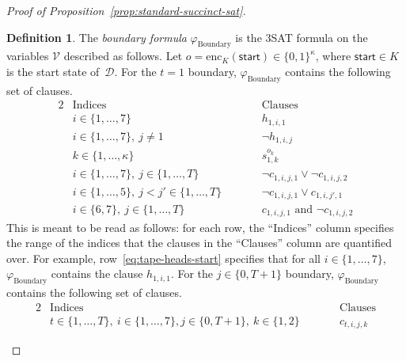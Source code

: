\documentclass[11pt]{article}
\theoremstyle{definition}
\newtheorem{definition}[theorem]{Definition}
\newcommand{\decider}{\mathcal{D}}
\begin{document}
\begin{proof}[Proof of Proposition~\ref{prop:standard-succinct-sat}]
  \begin{definition}
    The \emph{boundary formula} $\varphi_{\mathrm{Boundary}}$ is the 3SAT
    formula on the variables $\mathcal{V}$ described as follows.
    Let $o = \mathrm{enc}_K({\mathsf{start}}) \in \{0, 1\}^\kappa$, where
    ${\mathsf{start}} \in K$ is the start state of~$\decider$.
    For the $t= 1$ boundary, $\varphi_{\mathrm{Boundary}}$ contains the
    following set of clauses.
    \begin{alignat}{2}
      & \text{Indices} & \qquad & \text{Clauses}\nonumber\\
      & i \in \{1, \ldots, 7\} && h_{1, i, 1}
      \label{eq:tape-heads-start}\\
      & i \in \{1, \ldots, 7\},~ j \neq 1 && \neg h_{1, i, j}
      \label{eq:no-more-tape-heads}\\
      & k \in \{1, \ldots, \kappa\} && s_{1, k}^{o_k}
      \label{eq:start-state}\\
      & i \in \{1, \ldots, 7\},~ j \in \{1, \ldots, T\} &&
      \neg c_{1, i, j, 1} \lor \neg c_{1, i, j, 2}
      \label{eq:not-square}\\
      & i \in \{1, \ldots, 5\},~ j < j' \in \{1, \ldots, T\} &&
      \neg c_{1, i, j, 1} \lor c_{1, i, j', 1}
      \label{eq:trailing-empty}\\
      & i \in \{6, 7\},~ j \in \{1, \ldots, T\}
      && c_{1, i, j, 1} \text{ and } \neg c_{1, i, j, 2}
      \label{eq:all-empty}
    \end{alignat}
    This is meant to be read as follows: for each row, the ``Indices'' column
    specifies the range of the indices that the clauses in the ``Clauses'' column
    are quantified over.
    For example, row~\eqref{eq:tape-heads-start} specifies that for all $i \in
    \{1, \ldots, 7\}$, $\varphi_{\mathrm{Boundary}}$ contains the clause $h_{1,
      i, 1}$.
    For the $j \in \{0, T+1\}$ boundary, $\varphi_{\mathrm{Boundary}}$ contains
    the following set of clauses.
    \begin{alignat}{2}
      & \text{Indices} & \qquad & \text{Clauses}\nonumber\\
      & t \in \{1, \ldots, T\},~i \in \{1, \ldots, 7\},
      j \in \{0, T+1\},~k \in \{1, 2\}
      && c_{t, i, j, k} \label{eq:square}
    \end{alignat}
  \end{definition}


\end{proof}
\end{document}

